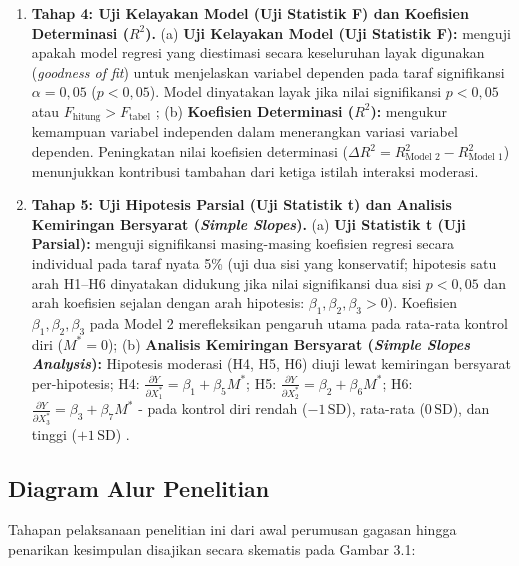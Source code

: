 \documentclass[12pt,a4paper]{article}
\numberwithin{equation}{section}
\numberwithin{table}{section}
\numberwithin{figure}{section}
\begin{document}
\begin{enumerate}
  \item \textbf{Tahap 4: Uji Kelayakan Model (Uji Statistik F) dan Koefisien Determinasi ($R^2$).} (a) \textbf{Uji Kelayakan Model (Uji Statistik F):} menguji apakah model regresi yang diestimasi secara keseluruhan layak digunakan (\emph{goodness of fit}) untuk menjelaskan variabel dependen pada taraf signifikansi $\alpha = 0{,}05$ ($p < 0{,}05$). Model dinyatakan layak jika nilai signifikansi $p < 0{,}05$ atau $F_{\text{hitung}} > F_{\text{tabel}}$ \citep{ghozali2018aplikasi}; (b) \textbf{Koefisien Determinasi ($R^2$):} mengukur kemampuan variabel independen dalam menerangkan variasi variabel dependen. Peningkatan nilai koefisien determinasi ($\Delta R^2 = R^2_{\text{Model 2}} - R^2_{\text{Model 1}}$) menunjukkan kontribusi tambahan dari ketiga istilah interaksi moderasi.

  \item \textbf{Tahap 5: Uji Hipotesis Parsial (Uji Statistik t) dan Analisis Kemiringan Bersyarat (\emph{Simple Slopes}).} (a) \textbf{Uji Statistik t (Uji Parsial):} menguji signifikansi masing-masing koefisien regresi secara individual pada taraf nyata 5\% (uji dua sisi yang konservatif; hipotesis satu arah H1--H6 dinyatakan didukung jika nilai signifikansi dua sisi $p < 0,05$ dan arah koefisien sejalan dengan arah hipotesis: $\beta_1, \beta_2, \beta_3 > 0$). Koefisien $\beta_1, \beta_2, \beta_3$ pada Model 2 merefleksikan pengaruh utama pada rata-rata kontrol diri ($M^* = 0$); (b) \textbf{Analisis Kemiringan Bersyarat (\emph{Simple Slopes Analysis}):} Hipotesis moderasi (H4, H5, H6) diuji lewat kemiringan bersyarat per-hipotesis; H4: $\frac{\partial Y}{\partial X_1^*} = \beta_1 + \beta_5 M^*$; H5: $\frac{\partial Y}{\partial X_2^*} = \beta_2 + \beta_6 M^*$; H6: $\frac{\partial Y}{\partial X_3^*} = \beta_3 + \beta_7 M^*$ - pada kontrol diri rendah ($-1\,\text{SD}$), rata-rata ($0\,\text{SD}$), dan tinggi ($+1\,\text{SD}$) \citep{aiken1991multiple, hayes2018introduction}.
\end{enumerate}

\subsection{Diagram Alur Penelitian}

Tahapan pelaksanaan penelitian ini dari awal perumusan gagasan hingga penarikan kesimpulan disajikan secara skematis pada Gambar 3.1:
\end{document}
